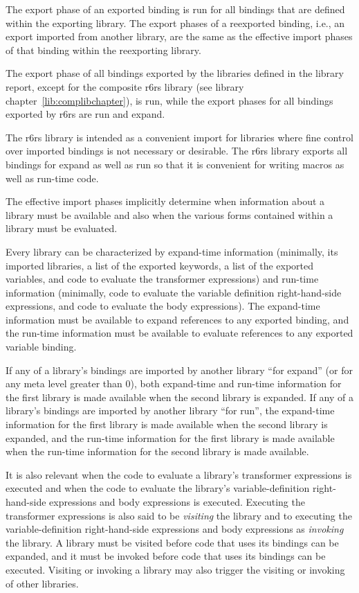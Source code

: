 The export phase of an exported binding is {\cf run} for all bindings
that are defined within the exporting library. The export phases of a
reexported binding, i.e., an export imported from another library, are the
same as the effective import phases of that binding within the reexporting
library.

The export phase of all bindings exported by the libraries defined in
the library report, except for the composite {\cf r6rs} library
(see library chapter~\ref{lib:complibchapter}), is {\cf run}, while
the export phases for all bindings exported by {\cf r6rs} are {\cf run}
and {\cf expand}.

\begin{rationale} 
The {\cf r6rs} library is intended as a convenient import for libraries where fine
control over imported bindings is not necessary or desirable. The {\cf r6rs} library
exports all bindings for {\cf expand} as well as {\cf run} so that it is convenient
for writing macros as well as run-time code.
\end{rationale}

The effective import phases implicitly determine when information about a
library must be available and also when the various forms contained within
a library must be evaluated.

Every library can be characterized by expand-time information (minimally,
its imported libraries, a list of the exported keywords, a list of the
exported variables, and code to evaluate the transformer expressions) and
run-time information (minimally, code to evaluate the variable definition
right-hand-side expressions, and code to evaluate the body expressions).
The expand-time information must be available to expand references to
any exported binding, and the run-time information must be available to
evaluate references to any exported variable binding.

If any of a library's bindings are imported by another library ``for
{\cf expand}'' (or for any meta level greater than 0), both expand-time and
run-time information for the first library is made available when the second
library is expanded.
If any of a library's bindings are imported by another library ``for
{\cf run}'', the expand-time information for the first library is made available when
the second library is expanded, and the run-time information for the first
library is made available when the run-time information for the second library
is made available.

It is also relevant when the code to evaluate a library's transformer
expressions is executed and when the code to evaluate the library's
variable-definition right-hand-side expressions and body expressions is
executed.
Executing the transformer expressions is also said to be \emph{visiting}
the library and to executing the variable-definition right-hand-side 
expressions and body expressions as \emph{invoking} the library.
A library must be visited before code that uses its bindings can be
expanded, and it must be invoked before code that uses its bindings can be
executed.
Visiting or invoking a library may also trigger the visiting or
invoking of other libraries.

